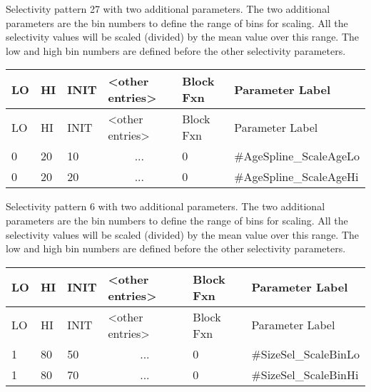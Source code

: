 \hypertarget{CubicSplineScaling}{}
Selectivity pattern 27 with two additional parameters. The two additional parameters are the bin numbers to define the range of bins for scaling. All the selectivity values will be scaled (divided) by the mean value over this range. The low and high bin numbers are defined before the other selectivity parameters.

	\begin{longtable}{p{1cm} p{1cm} p{1cm} p{2.9cm} p{1.9cm} p{4.2cm}}
		\hline
		LO \Tstrut & HI & INIT & <other entries> & Block Fxn & Parameter Label \Bstrut\\
		\hline
		\endfirsthead
	
		\hline
		LO \Tstrut & HI & INIT & <other entries> & Block Fxn & Parameter Label \Bstrut\\
		\hline
		\endhead

		0 & 20 & 10 & \multicolumn{1}{c}{...} & 0 & \#AgeSpline\_ScaleAgeLo \Tstrut\\
		0 & 20 & 20 & \multicolumn{1}{c}{...} & 0 & \#AgeSpline\_ScaleAgeHi \Bstrut\\
		\hline
	\end{longtable}

\hypertarget{NonParamScaling}{}
Selectivity pattern 6 with two additional parameters. The two additional parameters are the bin numbers to define the range of bins for scaling. All the selectivity values will be scaled (divided) by the mean value over this range. The low and high bin numbers are defined before the other selectivity parameters.
	
	\begin{longtable}{p{1cm} p{1cm} p{1cm} p{2.9cm} p{1.9cm} p{4.2cm}}
		\hline
		LO \Tstrut & HI & INIT & <other entries> & Block Fxn & Parameter Label \Bstrut\\
		\hline
		\endfirsthead
	
		\hline
		LO \Tstrut & HI & INIT & <other entries> & Block Fxn & Parameter Label \Bstrut\\
		\hline
		\endhead

		1 & 80 & 50 & \multicolumn{1}{c}{...} & 0 & \#SizeSel\_ScaleBinLo \Tstrut\\
		1 & 80 & 70 & \multicolumn{1}{c}{...} & 0 & \#SizeSel\_ScaleBinHi \Bstrut\\
		\hline
	\end{longtable}

